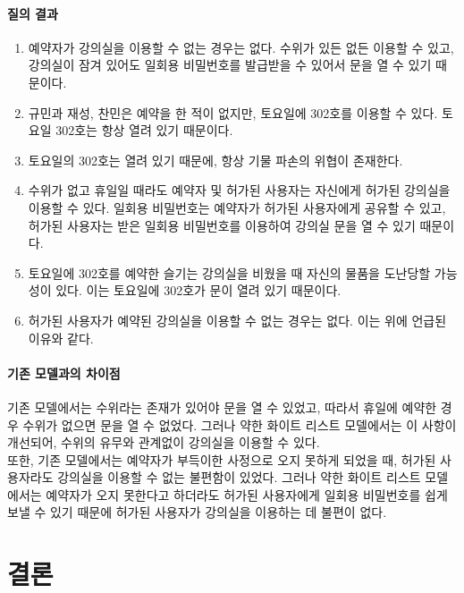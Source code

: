 \documentclass[11pt,a4paper]{article}
\begin{document}
\paragraph{질의 결과}
\begin{enumerate}
\item 예약자가 강의실을 이용할 수 없는 경우는 없다. 수위가 있든 없든 이용할 수 있고, 강의실이 잠겨 있어도 일회용 비밀번호를 발급받을 수 있어서 문을 열 수 있기 때문이다.
\item 규민과 재성, 찬민은 예약을 한 적이 없지만, 토요일에 302호를 이용할 수 있다. 토요일 302호는 항상 열려 있기 때문이다.
\item 토요일의 302호는 열려 있기 때문에, 항상 기물 파손의 위협이 존재한다.
\item 수위가 없고 휴일일 때라도 예약자 및 허가된 사용자는 자신에게 허가된 강의실을 이용할 수 있다. 일회용 비밀번호는 예약자가 허가된 사용자에게 공유할 수 있고, 허가된 사용자는 받은 일회용 비밀번호를 이용하여 강의실 문을 열 수 있기 때문이다.
\item 토요일에 302호를 예약한 슬기는 강의실을 비웠을 때 자신의 물품을 도난당할 가능성이 있다. 이는 토요일에 302호가 문이 열려 있기 때문이다.
\item 허가된 사용자가 예약된 강의실을 이용할 수 없는 경우는 없다. 이는 위에 언급된 이유와 같다.
\end{enumerate}

\paragraph{기존 모델과의 차이점}
\hfill\break
기존 모델에서는 수위라는 존재가 있어야 문을 열 수 있었고, 따라서 휴일에 예약한 경우 수위가 없으면 문을 열 수 없었다. 그러나 약한 화이트 리스트 모델에서는 이 사항이 개선되어, 수위의 유무와 관계없이 강의실을 이용할 수 있다.\\
또한, 기존 모델에서는 예약자가 부득이한 사정으로 오지 못하게 되었을 때, 허가된 사용자라도 강의실을 이용할 수 없는 불편함이 있었다. 그러나 약한 화이트 리스트 모델에서는 예약자가 오지 못한다고 하더라도 허가된 사용자에게 일회용 비밀번호를 쉽게 보낼 수 있기 때문에 허가된 사용자가 강의실을 이용하는 데 불편이 없다.

\section{결론}
\end{document}
